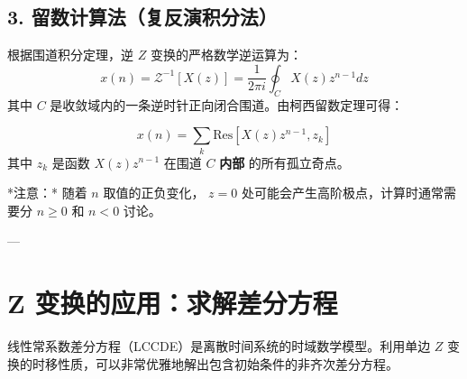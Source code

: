 \subsection{3. 留数计算法（复反演积分法）}
根据围道积分定理，逆 $Z$ 变换的严格数学逆运算为：
$$ x(n) = \mathcal{Z}^{-1}[X(z)] = \frac{1}{2\pi i} \oint_{C} X(z) z^{n-1} dz $$
其中 $C$ 是收敛域内的一条逆时针正向闭合围道。由柯西留数定理可得：
\begin{tcolorbox}[colback=teal!5!white, colframe=teal!75!black, title=定理 \thechapter.6 \quad 留数法求逆 Z 变换]
	$$ x(n) = \sum_{k} \text{Res}[X(z) z^{n-1}, z_k] $$
	其中 $z_k$ 是函数 $X(z)z^{n-1}$ 在围道 $C$ \textbf{内部} 的所有孤立奇点。
\end{tcolorbox}
*注意：* 随着 $n$ 取值的正负变化， $z=0$ 处可能会产生高阶极点，计算时通常需要分 $n \ge 0$ 和 $n < 0$ 讨论。

---

\section{Z 变换的应用：求解差分方程}

线性常系数差分方程（LCCDE）是离散时间系统的时域数学模型。利用单边 $Z$ 变换的时移性质，可以非常优雅地解出包含初始条件的非齐次差分方程。

